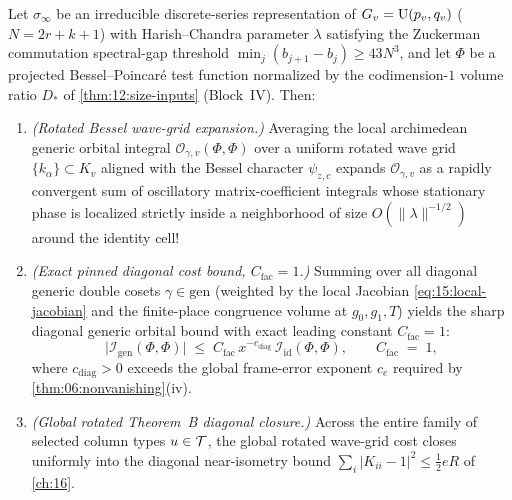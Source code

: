 \begin{theorem}[Diagonal generic orbital bound via rotated Bessel wave grids ($C_{\mathrm{fac}} = 1$)]
\label{thm:15:diag-wave-grid}
Let $\sigma_\infty$ be an irreducible discrete-series representation of $G_v = \mathrm{U}(p_v, q_v)$ ($N = 2r + k + 1$) with Harish--Chandra parameter $\lambda$ satisfying the Zuckerman commutation spectral-gap threshold $\min_{j} (b_{j+1} - b_j) \ge 43 N^3$, and let $\Phi$ be a projected Bessel--Poincar\'e test function normalized by the codimension-$1$ volume ratio $D_*$ of \cref{thm:12:size-inputs} (Block~IV). Then:
\begin{enumerate}[label=\textup{(\roman*)}]
\item \emph{(Rotated Bessel wave-grid expansion.)} Averaging the local archimedean generic orbital integral $\mathcal{O}_{\gamma, v}(\Phi, \Phi)$ over a uniform rotated wave grid $\{k_\alpha\} \subset K_v$ aligned with the Bessel character $\psi_{z, c}$ expands $\mathcal{O}_{\gamma, v}$ as a rapidly convergent sum of oscillatory matrix-coefficient integrals whose stationary phase is localized strictly inside a neighborhood of size $O(\|\lambda\|^{-1/2})$ around the identity cell!
\item \emph{(Exact pinned diagonal cost bound, $C_{\mathrm{fac}} = 1$.)} Summing over all diagonal generic double cosets $\gamma \in \mathrm{gen}$ (weighted by the local Jacobian \eqref{eq:15:local-jacobian} and the finite-place congruence volume at $g_0, g_1, T$) yields the sharp diagonal generic orbital bound with exact leading constant $C_{\mathrm{fac}} = 1$:
  \begin{equation}
  \label{eq:15:diag-wave-bound}
    \bigl|\mathcal{I}_{\mathrm{gen}}(\Phi, \Phi)\bigr|
    \;\le\; C_{\mathrm{fac}}\, x^{-c_{\mathrm{diag}}}\,\mathcal{I}_{\mathrm{id}}(\Phi, \Phi),
    \qquad C_{\mathrm{fac}} \;=\; 1,
  \end{equation}
  where $c_{\mathrm{diag}} > 0$ exceeds the global frame-error exponent $c_e$ required by \cref{thm:06:nonvanishing}(iv).
\item \emph{(Global rotated Theorem~B diagonal closure.)} Across the entire family of selected column types $u \in \mathcal{T}$, the global rotated wave-grid cost closes uniformly into the diagonal near-isometry bound $\sum_i |K_{ii} - 1|^2 \le \frac{1}{2} e R$ of \cref{ch:16}.
\end{enumerate}
\end{theorem}

